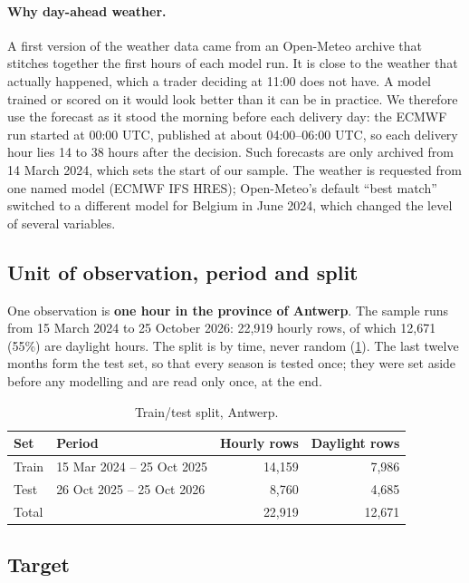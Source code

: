 \documentclass[11pt,a4paper]{article}
\begin{document}
\paragraph{Why day-ahead weather.}
A first version of the weather data came from an Open-Meteo archive that stitches together the
first hours of each model run. It is close to the weather that actually happened, which a trader
deciding at 11:00 does not have. A model trained or scored on it would look better than it can be
in practice. We therefore use the forecast as it stood the morning before each delivery day: the
ECMWF run started at 00:00 UTC, published at about 04:00--06:00 UTC, so each delivery hour lies 14
to 38 hours after the decision. Such forecasts are only archived from 14 March 2024, which sets the
start of our sample. The weather is requested from one named model (ECMWF IFS HRES); Open-Meteo's
default ``best match'' switched to a different model for Belgium in June 2024, which changed the
level of several variables.

\subsection{Unit of observation, period and split}

One observation is \textbf{one hour in the province of Antwerp}. The sample runs from 15 March 2024
to 25 October 2026: 22,919 hourly rows, of which 12,671 (55\%) are daylight hours. The split is by
time, never random (\cref{tab:split}). The last twelve months form the test set, so that every
season is tested once; they were set aside before any modelling and are read only once, at the end.

\begin{table}[ht]
\centering\small
\caption{Train/test split, Antwerp.}
\label{tab:split}
\begin{tabular}{@{}l l r r@{}}
\toprule
Set & Period & Hourly rows & Daylight rows \\
\midrule
Train & 15 Mar 2024 -- 25 Oct 2025 & 14,159 & 7,986 \\
Test  & 26 Oct 2025 -- 25 Oct 2026 & 8,760 & 4,685 \\
\midrule
Total & & 22,919 & 12,671 \\
\bottomrule
\end{tabular}
\end{table}

\subsection{Target}
\end{document}
